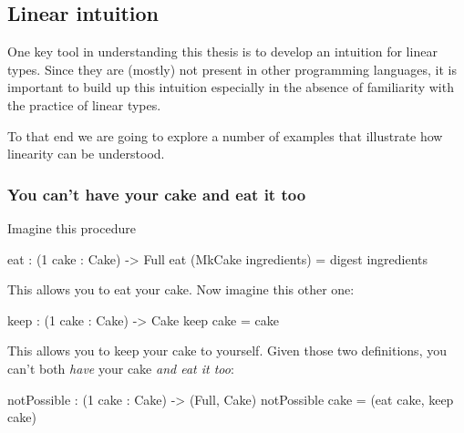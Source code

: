 \documentclass[
]{article}
\newenvironment{Shaded}{}{}
\newcommand{\DataTypeTok}[1]{\textcolor[rgb]{0.56,0.13,0.00}{#1}}
\newcommand{\DecValTok}[1]{\textcolor[rgb]{0.25,0.63,0.44}{#1}}
\newcommand{\NormalTok}[1]{#1}
\newcommand{\OperatorTok}[1]{\textcolor[rgb]{0.40,0.40,0.40}{#1}}
\newcommand{\OtherTok}[1]{\textcolor[rgb]{0.00,0.44,0.13}{#1}}
\begin{document}
\hypertarget{linear-intuition}{%
\subsection{Linear intuition}\label{linear-intuition}}

One key tool in understanding this thesis is to develop an intuition for
linear types. Since they are (mostly) not present in other programming
languages, it is important to build up this intuition especially in the
absence of familiarity with the practice of linear types.

To that end we are going to explore a number of examples that illustrate
how linearity can be understood.

\hypertarget{you-cant-have-your-cake-and-eat-it-too}{%
\subsubsection{You can't have your cake and eat it
too}\label{you-cant-have-your-cake-and-eat-it-too}}

Imagine this procedure

\begin{Shaded}
\begin{Highlighting}[]
\NormalTok{eat }\OperatorTok{:}\NormalTok{ (}\DecValTok{1}\NormalTok{ cake }\OperatorTok{:} \DataTypeTok{Cake}\NormalTok{) }\OtherTok{{-}\textgreater{}} \DataTypeTok{Full}
\NormalTok{eat (}\DataTypeTok{MkCake}\NormalTok{ ingredients) }\OtherTok{=}\NormalTok{ digest ingredients}
\end{Highlighting}
\end{Shaded}

This allows you to eat your cake. Now imagine this other one:

\begin{Shaded}
\begin{Highlighting}[]
\NormalTok{keep }\OperatorTok{:}\NormalTok{ (}\DecValTok{1}\NormalTok{ cake }\OperatorTok{:} \DataTypeTok{Cake}\NormalTok{) }\OtherTok{{-}\textgreater{}} \DataTypeTok{Cake}
\NormalTok{keep cake }\OtherTok{=}\NormalTok{ cake}
\end{Highlighting}
\end{Shaded}

This allows you to keep your cake to yourself. Given those two
definitions, you can't both \emph{have} your cake \emph{and eat it too}:

\begin{Shaded}
\begin{Highlighting}[]
\NormalTok{notPossible }\OperatorTok{:}\NormalTok{ (}\DecValTok{1}\NormalTok{ cake }\OperatorTok{:} \DataTypeTok{Cake}\NormalTok{) }\OtherTok{{-}\textgreater{}}\NormalTok{ (}\DataTypeTok{Full}\NormalTok{, }\DataTypeTok{Cake}\NormalTok{)}
\NormalTok{notPossible cake }\OtherTok{=}\NormalTok{ (eat cake, keep cake)}
\end{Highlighting}
\end{Shaded}
\end{document}
